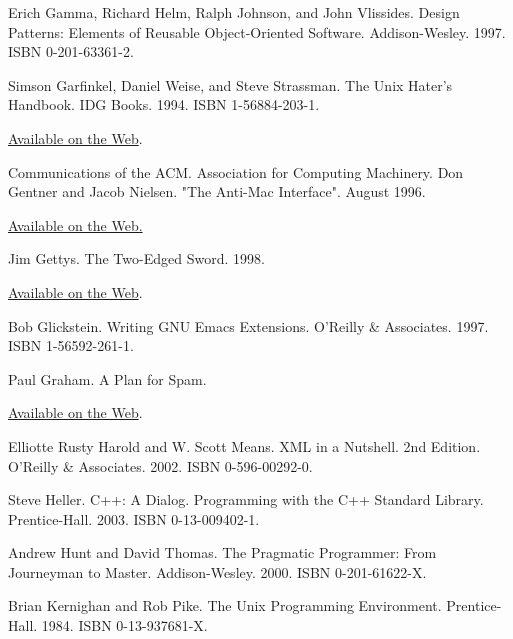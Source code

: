 \documentclass[12pt,oneside]{book}
\begin{document}
\begin{common-format}
\begin{thebibliography}{9}
 Erich Gamma, Richard Helm, Ralph Johnson, and John Vlissides. Design Patterns: Elements of Reusable Object-Oriented Software. Addison-Wesley. 1997. ISBN 0-201-63361-2.

 Simson Garfinkel, Daniel Weise, and Steve Strassman. The Unix Hater's Handbook. IDG Books. 1994. ISBN 1-56884-203-1.

\href{http://research.microsoft.com/~daniel/unix-haters.html}{Available on the Web}.

 Communications of the ACM. Association for Computing Machinery. Don Gentner and Jacob Nielsen. "The Anti-Mac Interface". August 1996.

\href{http://www.acm.org/cacm/AUG96/antimac.htm}{Available on the Web.}

 Jim Gettys. The Two-Edged Sword. 1998.

\href{http://freshmeat.net/articles/view/122/}{Available on the Web}.

 Bob Glickstein. Writing GNU Emacs Extensions. O'Reilly \&{} Associates. 1997. ISBN 1-56592-261-1.

 Paul Graham. A Plan for Spam.

\href{http://www.paulgraham.com/spam.html}{Available on the Web}.

 Elliotte Rusty Harold and W. Scott Means. XML in a Nutshell. 2nd Edition. O'Reilly \&{} Associates. 2002. ISBN 0-596-00292-0.

%
%
%
%
%

 Steve Heller. C++: A Dialog. Programming with the C++ Standard Library. Prentice-Hall. 2003. ISBN 0-13-009402-1.

 Andrew Hunt and David Thomas. The Pragmatic Programmer: From Journeyman to Master. Addison-Wesley. 2000. ISBN 0-201-61622-X.

%
%
 Brian Kernighan and Rob Pike. The Unix Programming Environment. Prentice-Hall. 1984. ISBN 0-13-937681-X.


\end{thebibliography}
\end{common-format}
\end{document}
